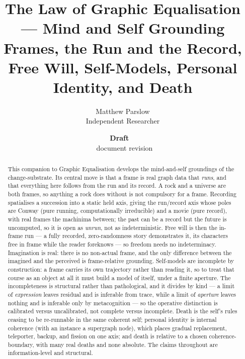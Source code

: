 \documentclass[11pt,a4paper]{article}
\title{The Law of Graphic Equalisation --- Mind and Self Grounding\\\large Frames, the Run and the Record, Free Will, Self-Models, Personal Identity, and Death}
\author{Matthew Parslow\\Independent Researcher}
\date{\textbf{Draft \texorpdfstring{\textemdash}{---}\ \PaperDraft}\\[2pt]\PaperDisplayDate \texorpdfstring{\textbullet}{\textperiodcentered}\ document revision \PaperRevision}
\theoremstyle{remark}\newtheorem{remark}[definition]{Remark}
\begin{document}
\maketitle
\begin{center}
\end{center}
\vspace{1em}

\begin{abstract}
This companion to Graphic Equalisation develops the mind-and-self groundings of the
change-substrate. Its central move is that a frame is real graph data that
\emph{runs}, and that everything here follows from the run and its record. A rock and a
universe are both frames, so anything a rock does without is not compulsory for a frame.
Recording spatialises a succession into a static held axis, giving the run/record
axis whose poles are Conway (pure running, computationally irreducible) and a movie
(pure record), with real frames the machinima between; the past can be a record but
the future is uncomputed, so it is open as \emph{unrun}, not as indeterministic. Free
will is then the in-frame run --- a fully recorded, zero-randomness story
demonstrates it, its characters free in frame while the reader foreknows --- so
freedom needs no indeterminacy. Imagination is real: there is no non-actual frame,
and the only difference between the imagined and the perceived is frame-relative
grounding. Self-models are incomplete by construction: a frame carries its own
trajectory rather than reading it, so to treat that course as an object at all it must
build a model of itself, under a finite aperture. The incompleteness is structural
rather than pathological, and it divides by kind --- a limit of \emph{expression}
leaves residual and is inferable from trace, while a limit of \emph{aperture} leaves
nothing and is inferable only by metacognition --- so the operative distinction is
calibrated versus uncalibrated, not complete versus incomplete. Death is the self's
rules ceasing to be re-runnable in the same coherent
self; personal identity is internal coherence (with an instance a supergraph node),
which places gradual replacement, teleporter, backup, and fission on one axis; and
death is relative to a chosen coherence-boundary, with many real deaths and none
absolute. The claims throughout are information-level and structural.
\end{abstract}
\end{document}
